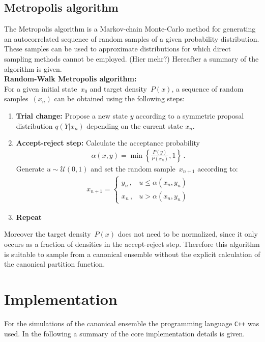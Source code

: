\documentclass[11pt, a4paper]{article}
\numberwithin{equation}{section}
\newcommand{\remark}[1]{{\color{red}(#1)}}
\begin{document}
\subsection{Metropolis algorithm} \label{sec:Metropolis}
The Metropolis algorithm is a Markov-chain Monte-Carlo method for generating an autocorrelated sequence of random samples of a given probability distribution.
These samples can be used to approximate distributions for which direct sampling methods cannot be employed. \remark{Hier mehr?}
Hereafter a summary of the algorithm is given.\\

\noindent\textbf{Random-Walk Metropolis algorithm:}\\
For a given initial state~$x_0$ and target density~$P(x)$, a sequence of random samples~$\left( x_n \right)$ can be obtained using the following steps:
\begin{enumerate}
	\item \textbf{Trial change:}
		Propose a new state $y$ according to a symmetric proposal distribution $q(Y|x_n)$ depending on the current state $x_n$.
		
	\item \textbf{Accept-reject step:}
		Calculate the acceptance probability
		\begin{align}
			\alpha(x, y) = \min\left\{ \frac{P(y)}{P(x_n)}, 1\right\} \,\text{.}
			\label{eq:acceptance_probability}
		\end{align}
		Generate $u \sim \mathcal{U}(0, 1)$ and set the random sample~$x_{n+1}$ according to:
		\begin{align*}
			x_{n+1} = \begin{cases}
					y_n \,, & u \leq \alpha(x_n, y_n) \\
					x_n \,, & u > \alpha(x_n, y_n)
				\end{cases}
		\end{align*}
		
	\item \textbf{Repeat}
\end{enumerate}
Moreover the target density~$P(x)$ does not need to be normalized, since it only occurs as a fraction of densities in the accept-reject step.
Therefore this algorithm is suitable to sample from a canonical ensemble without the explicit calculation of the canonical partition function.


\section{Implementation}
For the simulations of the canonical ensemble the programming language \texttt{C++} was used.
In the following a summary of the core implementation details is given.
\end{document}
